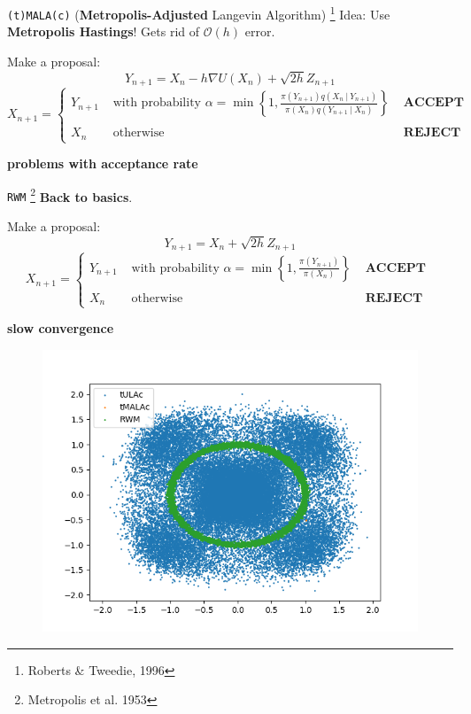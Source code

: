\documentclass[aspectratio=169]{beamer}
\newcommand{\grad}{\nabla}
\begin{document}
\begin{frame}{\texttt{(t)MALA(c)} (\textbf{Metropolis-Adjusted} Langevin Algorithm)    \footnote{Roberts \& Tweedie, 1996}}
    Idea: Use \textbf{Metropolis Hastings}! Gets rid of $\mathcal O (h)$ error.
    
        Make a proposal:
        \[ Y_{n+1} = X_n - h\grad U(X_n)  + \sqrt{2h}Z_{n+1}\] \[\]
        \[ X_{n+1} = \begin{cases}
            Y_{n+1} & \text{ with probability } \alpha = \min \left\lbrace 1, \frac{ \pi\left( Y_{n+1}\right) q (X_n\ |\ Y_{n+1}) } { \pi\left( X_n\right) q (Y_{n+1}\ |\ X_n) } \right\rbrace & \textbf{ ACCEPT } \\ \\ 
            X_n & \text{ otherwise } & \textbf{ REJECT }
        \end{cases}\]
   \[\]
   \[\]
   \centerline{\textbf{problems with acceptance rate}}
\end{frame}


\begin{frame}{\texttt{RWM} \footnote{Metropolis et al. 1953}}
    \textbf{Back to basics}.
    
        Make a proposal:
        \[ Y_{n+1} = X_n + \sqrt{2h}Z_{n+1}\] \[\]
        \[ X_{n+1} = \begin{cases}
            Y_{n+1} & \text{ with probability } \alpha = \min \left\lbrace 1, \frac{ \pi\left( Y_{n+1}\right) } { \pi\left( X_n\right) } \right\rbrace & \textbf{ ACCEPT } \\ \\ 
            X_n & \text{ otherwise } & \textbf{ REJECT }
        \end{cases}\]
   \[\]
   \[\]
   \centerline{\textbf{slow convergence}}
\end{frame}



\begin{frame}
\begin{figure}
    \centering
    \includegraphics[width=0.8\linewidth]{Figures/transparentDoubleWell.png}
\end{figure}
\end{frame}
\end{document}
